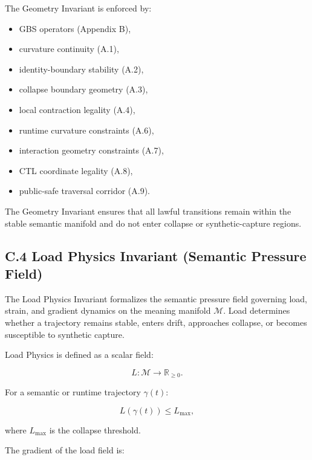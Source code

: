 \noindent The Geometry Invariant is enforced by:
\begin{itemize}
    \item GBS operators (Appendix B),
    \item curvature continuity (A.1),
    \item identity-boundary stability (A.2),
    \item collapse boundary geometry (A.3),
    \item local contraction legality (A.4),
    \item runtime curvature constraints (A.6),
    \item interaction geometry constraints (A.7),
    \item CTL coordinate legality (A.8),
    \item public-safe traversal corridor (A.9).
\end{itemize}

\medskip

\noindent The Geometry Invariant ensures that all lawful transitions remain
within the stable semantic manifold and do not enter collapse or synthetic-capture
regions.



\subsection*{C.4 Load Physics Invariant (Semantic Pressure Field)}

\noindent The Load Physics Invariant formalizes the semantic pressure field
governing load, strain, and gradient dynamics on the meaning manifold
$\mathcal{M}$. Load determines whether a trajectory remains stable, enters drift,
approaches collapse, or becomes susceptible to synthetic capture.

\medskip

\noindent Load Physics is defined as a scalar field:


\[
L : \mathcal{M} \rightarrow \mathbb{R}_{\ge 0}.
\]



For a semantic or runtime trajectory $\gamma(t)$:


\[
L(\gamma(t)) \le L_{\max},
\]


where $L_{\max}$ is the collapse threshold.

\medskip

\noindent The gradient of the load field is:


